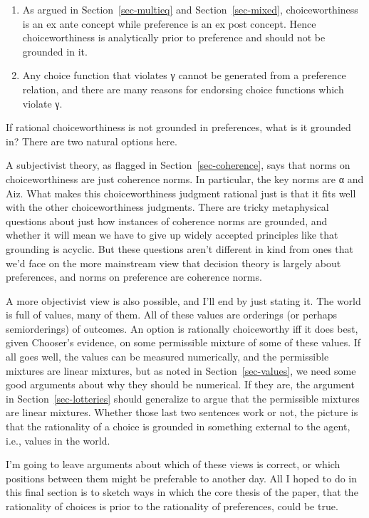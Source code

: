 \documentclass[
  11pt,
  letterpaper,
  DIV=11,
  numbers=noendperiod,
  twoside]{scrartcl}
\providecommand{\tightlist}{%
  \setlength{\itemsep}{0pt}\setlength{\parskip}{0pt}}
\begin{document}
\begin{enumerate}
\def\labelenumi{\arabic{enumi}.}
\tightlist
\item
  As argued in Section~\ref{sec-multieq} and Section~\ref{sec-mixed},
  choiceworthiness is an ex ante concept while preference is an ex post
  concept. Hence choiceworthiness is analytically prior to preference
  and should not be grounded in it.
\item
  Any choice function that violates γ cannot be generated from a
  preference relation, and there are many reasons for endorsing choice
  functions which violate γ.
\end{enumerate}

If rational choiceworthiness is not grounded in preferences, what is it
grounded in? There are two natural options here.

A subjectivist theory, as flagged in Section~\ref{sec-coherence}, says
that norms on choiceworthiness are just coherence norms. In particular,
the key norms are α and Aiz. What makes this choiceworthiness judgment
rational just is that it fits well with the other choiceworthiness
judgments. There are tricky metaphysical questions about just how
instances of coherence norms are grounded, and whether it will mean we
have to give up widely accepted principles like that grounding is
acyclic. But these questions aren't different in kind from ones that
we'd face on the more mainstream view that decision theory is largely
about preferences, and norms on preference are coherence norms.

A more objectivist view is also possible, and I'll end by just stating
it. The world is full of values, many of them. All of these values are
orderings (or perhaps semiorderings) of outcomes. An option is
rationally choiceworthy iff it does best, given Chooser's evidence, on
some permissible mixture of some of these values. If all goes well, the
values can be measured numerically, and the permissible mixtures are
linear mixtures, but as noted in Section~\ref{sec-values}, we need some
good arguments about why they should be numerical. If they are, the
argument in Section~\ref{sec-lotteries} should generalize to argue that
the permissible mixtures are linear mixtures. Whether those last two
sentences work or not, the picture is that the rationality of a choice
is grounded in something external to the agent, i.e., values in the
world.

I'm going to leave arguments about which of these views is correct, or
which positions between them might be preferable to another day. All I
hoped to do in this final section is to sketch ways in which the core
thesis of the paper, that the rationality of choices is prior to the
rationality of preferences, could be true.
\end{document}
